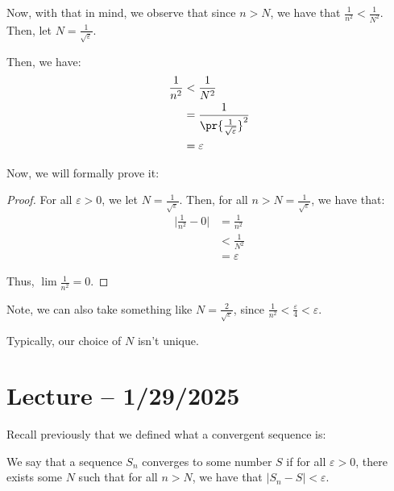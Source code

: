 \documentclass[openany]{book}
\begin{document}
Now, with that in mind, we observe that since $n > N$, we have that $\frac{1}{n^{2}} < \frac{1}{N^{2}}$. Then, let $N = \frac{1}{\sqrt{\varepsilon}}$. 

Then, we have:
\begin{align*}
	\frac{1}{n^{2}} &< \frac{1}{N^{2}} \\
	&= \frac{1}{\pr{\frac 1 {\sqrt\varepsilon}}^{2}} \\
	&= \varepsilon
\end{align*}

Now, we will formally prove it:
\begin{proof}
	For all $\varepsilon > 0$, we let $N = \frac{1}{\sqrt{\varepsilon}}$.  Then, for all $n > N = \frac{1}{\sqrt{\varepsilon}}$, we have that:
	\begin{align*}
		\lvert \frac{1}{n^{2}} - 0 \rvert &= \frac {1}{n^{2}} \\
		&< \frac{1}{N^{2}} \\
		&= \varepsilon
	\end{align*}
	
	Thus, $\lim \frac{1}{n^{2}} = 0$.
\end{proof}
\begin{rmk}
	Note, we can also take something like $N = \frac{2}{\sqrt{\varepsilon}}$, since $\frac{1}{n^{2}} < \frac{\varepsilon}{4} < \varepsilon$.
	
	Typically, our choice of $N$ isn't unique.
\end{rmk}

\section{Lecture -- 1/29/2025}
Recall previously that we defined what a convergent sequence is:
\begin{defn}
	We say that a sequence $S_n$ converges to some number $S$ if for all $\varepsilon > 0$, there exists some $N$ such that for all $n > N$, we have that $\lvert S_n - S \rvert < \varepsilon$.
\end{defn}
\end{document}
